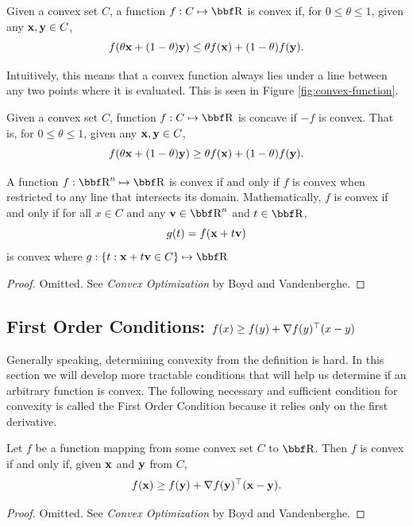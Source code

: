 \documentclass{article}
\begin{document}
\begin{definition}[Convex]
    Given a convex set $C$, a function $f : C \mapsto \RR$ is convex if,
    for $0\leq\theta\leq1$, given any ${\bf x},{\bf y}\in C$,
    \[
        f(\theta{\bf x} + (1-\theta){\bf y}) \leq \theta f({\bf x}) + (1-\theta)f({\bf y}).
    \]
\end{definition}

Intuitively, this means that a convex function always lies under a line
between any two points where it is evaluated. This is seen in Figure \ref{fig:convex-function}.

\begin{definition}
    Given a convex set $C$, function $f : C \mapsto \RR$ is concave
    if $-f$ is convex. That is, for $0\leq\theta\leq1$, given any ${\bf x},{\bf y}\in C$,
    \[
        f(\theta{\bf x} + (1-\theta){\bf y}) \geq \theta f({\bf x}) + (1-\theta)f({\bf y}).
    \]
\end{definition}

\begin{theorem}
    A function $f : \RR^n \mapsto \RR$ is convex if and only
    if $f$ is convex when restricted to any line that intersects
    its domain. Mathematically, $f$ is convex if and only if
    for all $x\in C$ and any $\vv\in\RR^n$ and $t\in\RR$,
    \[
        g(t) = f({\bf x} + t{\bf v})
    \]
    is convex where $g : \{t : \xx + t\vv \in C\} \mapsto \RR$
\end{theorem}
\begin{proof}
    Omitted. See \textit{Convex Optimization} by Boyd and Vandenberghe.
\end{proof}

\subsection{First Order Conditions: $f(x) \geq f(y) + \nabla f(y)^\top (x-y)$}

Generally speaking, determining convexity from the definition is
hard. In this section we will develop more tractable conditions that
will help us determine if an arbitrary function is convex. The following
necessary and sufficient condition for convexity is called the First Order
Condition because it relies only on the first derivative.

\begin{theorem}
    Let $f$ be a function mapping from some convex set $C$ to $\RR$. Then
    $f$ is convex if and only if, given ${\bf x}$ and ${\bf y}$ from $C$,
    \[
        f({\bf x}) \geq f({\bf y}) + \nabla f({\bf y})^\top ({\bf x} - {\bf y}).
    \]
\end{theorem}
\begin{proof}
    Omitted. See \textit{Convex Optimization} by Boyd and Vandenberghe.
\end{proof}
\end{document}
